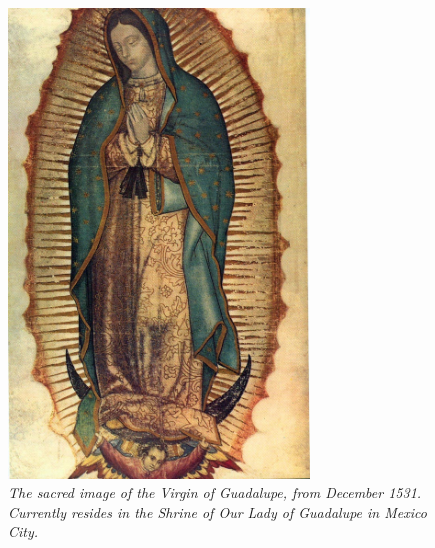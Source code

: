 \documentclass[10pt]{article}
\begin{document}
\begin{figure}[hb]
\centering
\includegraphics[width=8cm]{virgen.jpg}
\caption{\textit{The sacred image of the Virgin of Guadalupe, from December 1531.  Currently resides in the Shrine of Our Lady of Guadalupe in Mexico City.}}
\end{figure}
\end{document}
